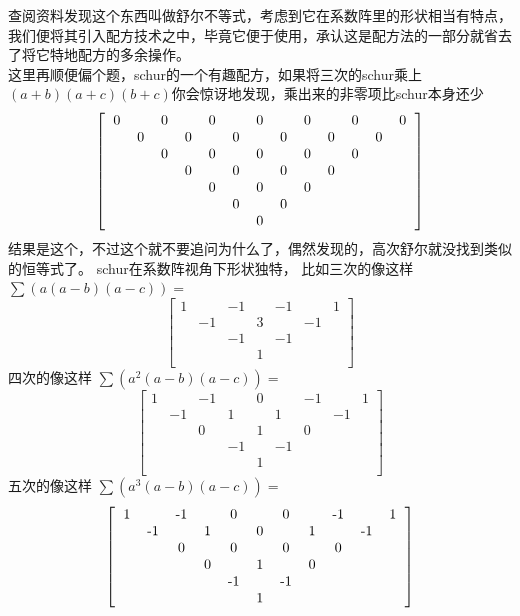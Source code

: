 \documentclass[UTF8]{ctexart}
\begin{document}
查阅资料发现这个东西叫做舒尔不等式，考虑到它在系数阵里的形状相当有特点，我们便将其引入配方技术之中，毕竟它便于使用，承认这是配方法的一部分就省去了将它特地配方的多余操作。\\
这里再顺便偏个题，schur的一个有趣配方，如果将三次的schur乘上$ (a+b)(a+c)(b+c) $你会惊讶地发现，乘出来的非零项比schur本身还少
\renewcommand*{\arraystretch}{1.732}\[\left[\begin{matrix}
	\begin{tabular}{ccccccccccccc}
		0& &0& &0& &0& &0& &0& &0\\
		&0& &0& &0& &0& &0& &0&\\
		& &0& &0& &0& &0& &0& &\\
		& & &0& &0& &0& &0& & &\\
		& & & &0& &0& &0& & & &\\
		& & & & &0& &0& & & & &\\
		& & & & & &0& & & & & &\\
	\end{tabular}
\end{matrix}\right]\]
结果是这个，不过这个就不要追问为什么了，偶然发现的，高次舒尔就没找到类似的恒等式了。
schur在系数阵视角下形状独特，
比如三次的像这样
$ \displaystyle \sum (a(a-b)(a-c))= $
\renewcommand*{\arraystretch}{1.732}\[\left[\begin{matrix}
	1& &-1& &-1& &1\\
	&-1& &3& &-1&\\
	& &-1& &-1& & \\
	& & &1& & &\\
\end{matrix}\right]\]
四次的像这样
$ \displaystyle \sum (a^{2}(a-b)(a-c))= $
\renewcommand*{\arraystretch}{1.732}\[\left[\begin{matrix}
	1& &-1& &0& &-1& &1\\
	&-1& &1& &1& &-1&\\
	& &0& &1& &0& &\\
	& & &-1& &-1& & &\\
	& & & &1& & & &\\
\end{matrix}\right]\]
五次的像这样
$ \displaystyle \sum (a^{3}(a-b)(a-c))= $
\renewcommand*{\arraystretch}{1.732}\[\left[\begin{matrix}
	\begin{tabular}{ccccccccccccc}
		1& &-1& &0& &0& &-1& &1\\
		&-1& &1& &0& &1& &-1&\\
		& &0& &0& &0& &0& &\\
		& & &0& &1& &0& & &\\
		& & & &-1& &-1& & & &\\
		& & & & &1& & & & &\\
	\end{tabular}
\end{matrix}\right]\]
\end{document}
